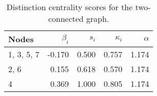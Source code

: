\begin{table}
\centering
\caption{\label{tab:tc}Distinction centrality scores for the two-connected graph.}
\centering
\begin{tabular}[t]{lrrrr}
\toprule
Nodes & $\beta_i$ & $s_i$ & $\kappa_i$ & $\alpha$\\
\midrule
1, 3, 5, 7 & -0.170 & 0.500 & 0.757 & 1.174\\
2, 6 & 0.155 & 0.618 & 0.570 & 1.174\\
4 & 0.369 & 1.000 & 0.805 & 1.174\\
\bottomrule
\end{tabular}
\end{table}
